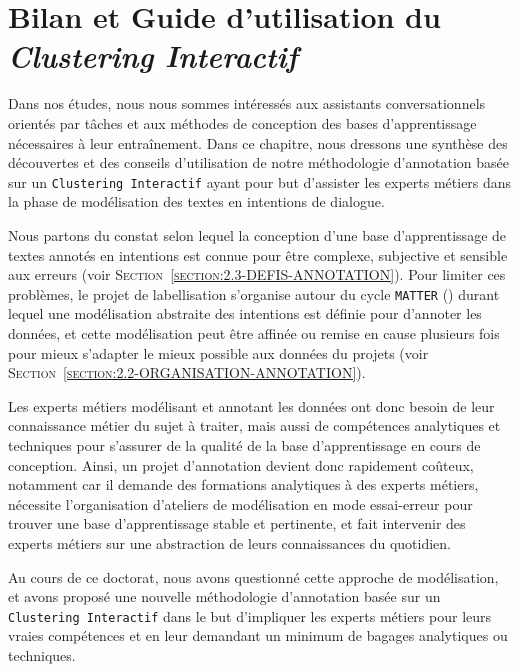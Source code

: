 \chapter{Bilan et Guide d'utilisation du \textit{Clustering Interactif}}
\label{chapter:5-GUIDE}
	
	Dans nos études, nous nous sommes intéressés aux assistants conversationnels orientés par tâches et aux méthodes de conception des bases d'apprentissage nécessaires à leur entraînement.
	Dans ce chapitre, nous dressons une synthèse des découvertes et des conseils d'utilisation de notre méthodologie d'annotation basée sur un \texttt{Clustering Interactif} ayant pour but d'assister les experts métiers dans la phase de modélisation des textes en intentions de dialogue.
	
	\begin{leftBarReminder}
		Nous partons du constat selon lequel la conception d'une base d'apprentissage de textes annotés en intentions est connue pour être complexe, subjective et sensible aux erreurs (voir \textsc{Section~\ref{section:2.3-DEFIS-ANNOTATION}}).
		Pour limiter ces problèmes, le projet de labellisation s'organise autour du cycle \texttt{MATTER} (\cite{pustejovsky-stubbs:2012:natural-language-annotation}) durant lequel une modélisation abstraite des intentions est définie pour d'annoter les données, et cette modélisation peut être affinée ou remise en cause plusieurs fois pour mieux s'adapter le mieux possible aux données du projets (voir \textsc{Section~\ref{section:2.2-ORGANISATION-ANNOTATION}}).
		
		Les experts métiers modélisant et annotant les données ont donc besoin de leur connaissance métier du sujet à traiter, mais aussi de compétences analytiques et techniques pour s'assurer de la qualité de la base d'apprentissage en cours de conception.
		Ainsi, un projet d'annotation devient donc rapidement coûteux, notamment car il demande des formations analytiques à des experts métiers, nécessite l'organisation d'ateliers de modélisation en mode essai-erreur pour trouver une base d'apprentissage stable et pertinente, et fait intervenir des experts métiers sur une abstraction de leurs connaissances du quotidien.
		
		Au cours de ce doctorat, nous avons questionné cette approche de modélisation, et avons proposé une nouvelle méthodologie d'annotation basée sur un \texttt{Clustering Interactif} dans le but d'impliquer les experts métiers pour leurs vraies compétences et en leur demandant un minimum de bagages analytiques ou techniques.
	\end{leftBarReminder}
	
